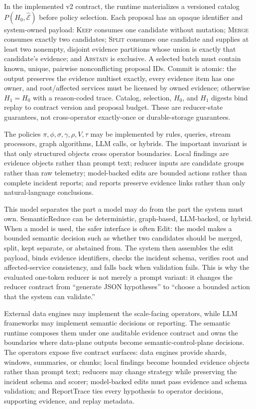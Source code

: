 \documentclass[sigplan,anonymous,nonacm]{acmart}
\begin{document}
In the implemented v2 contract, the runtime materializes a versioned catalog $P(H_0,\widehat{\mathcal{E}})$ before policy selection. Each proposal has an opaque identifier and system-owned payload: \textsc{Keep} consumes one candidate without mutation; \textsc{Merge} consumes exactly two candidates; \textsc{Split} consumes one candidate and supplies at least two nonempty, disjoint evidence partitions whose union is exactly that candidate's evidence; and \textsc{Abstain} is exclusive. A selected batch must contain known, unique, pairwise nonconflicting proposal IDs. Commit is atomic: the output preserves the evidence multiset exactly, every evidence item has one owner, and root/affected services must be licensed by owned evidence; otherwise $H_1=H_0$ with a reason-coded trace. Catalog, selection, $H_0$, and $H_1$ digests bind replay to contract version and proposal budget. These are reducer-state guarantees, not cross-operator exactly-once or durable-storage guarantees.

The policies $\pi,\phi,\sigma,\gamma,\rho,V,\tau$ may be implemented by rules, queries, stream processors, graph algorithms, LLM calls, or hybrids. The important invariant is that only structured objects cross operator boundaries. Local findings are evidence objects rather than prompt text; reducer inputs are candidate groups rather than raw telemetry; model-backed edits are bounded actions rather than complete incident reports; and reports preserve evidence links rather than only natural-language conclusions.

This model separates the part a model may do from the part the system must own. \textsf{SemanticReduce} can be deterministic, graph-based, LLM-backed, or hybrid. When a model is used, the safer interface is often \textsf{Edit}: the model makes a bounded semantic decision such as whether two candidates should be merged, split, kept separate, or abstained from. The system then assembles the edit payload, binds evidence identifiers, checks the incident schema, verifies root and affected-service consistency, and falls back when validation fails. This is why the evaluated one-token reducer is not merely a prompt variant: it changes the reducer contract from ``generate JSON hypotheses'' to ``choose a bounded action that the system can validate.''

External data engines may implement the scale-facing operators, while LLM frameworks may implement semantic decisions or reporting. The semantic runtime composes them under one auditable evidence contract and owns the boundaries where data-plane outputs become semantic-control-plane decisions. The operators expose five contract surfaces: data engines provide shards, windows, summaries, or chunks; local findings become bounded evidence objects rather than prompt text; reducers may change strategy while preserving the incident schema and scorer; model-backed edits must pass evidence and schema validation; and \textsf{ReportTrace} ties every hypothesis to operator decisions, supporting evidence, and replay metadata.
\end{document}
